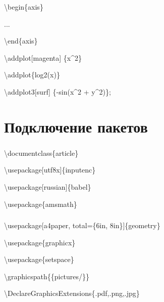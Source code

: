 \documentclass[russian, 14pt]{beamer}
\newcommand{\cm}[1]{{\color{Mycolor3}\textbackslash#1}}
\begin{document}
\begin{frame}
	\frametitle{\insertsection}
	\centering
\end{frame}

\begin{frame}
	\frametitle{\insertsection}
	\begin{block}{}
		\cm{begin}\{axis\}
		
		...
		
		\cm{end}\{axis\}
		
		\cm{addplot}[magenta] \{x\string^2\}
		
		\cm{addplot}\{log2(x)\}
		
		\cm{addplot}3[surf] \{-sin(x\string^2 + y\string^2)\};
	\end{block}
\end{frame}

\section{Подключение пакетов}

\begin{frame}
	\frametitle{\insertsection}
	\begin{block}{}
		\cm{documentclass}\{article\}
		
		
		\cm{usepackage}[utf8x]\{inputenc\}
		
		
		\cm{usepackage}[russian]\{babel\}
		
		
		\cm{usepackage}\{amsmath\}
	\end{block}
\end{frame}

\begin{frame}
	\frametitle{\insertsection}
	\begin{block}{}
		\cm{usepackage}[a4paper, total=\{6in, 8in\}]\{geometry\}
		
		
		\cm{usepackage}\{graphicx\}
		
		
		\cm{usepackage}\{setspace\}
		
		
		\cm{graphicspath}\{\{pictures/\}\}
		
		
		\cm{DeclareGraphicsExtensions}\{.pdf,.png,.jpg\}
	\end{block}
\end{frame}
\end{document}
